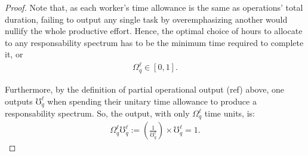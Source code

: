 \documentclass[hidelinks, nonatbib]{elsarticle}
\begin{document}
\begin{lemma}
\begin{proof}
        Note that, as each worker's time allowance is the same as operations' total duration, failing to output any single task by overemphasizing another would nullify the whole productive effort. Hence, the optimal choice of hours to allocate to any responsability spectrum has to be the minimum time required to complete it, or
        \begin{gather}
            \Omega_{q}^{\ell} 
            \in
            [0,1]
            .
        \end{gather}
        
        Furthermore, by the definition of partial operational output (ref) above, one outputs $\mho_{q}^{\ell}$ when spending their unitary time allowance to produce a responsability spectrum. So, the output, with only $\Omega_{q}^{\ell}$ time units, is:
        \begin{gather}
            \Omega_{q}^{\ell}
            \mho_{q}^{\ell}
            :=
            \left(
                \frac{1}{\mho_{q}^{\ell}}
            \right)
            \times
            \mho_{q}^{\ell}
            =
            1
            .
        \end{gather}
        

\end{proof}
\end{lemma}
\end{document}
